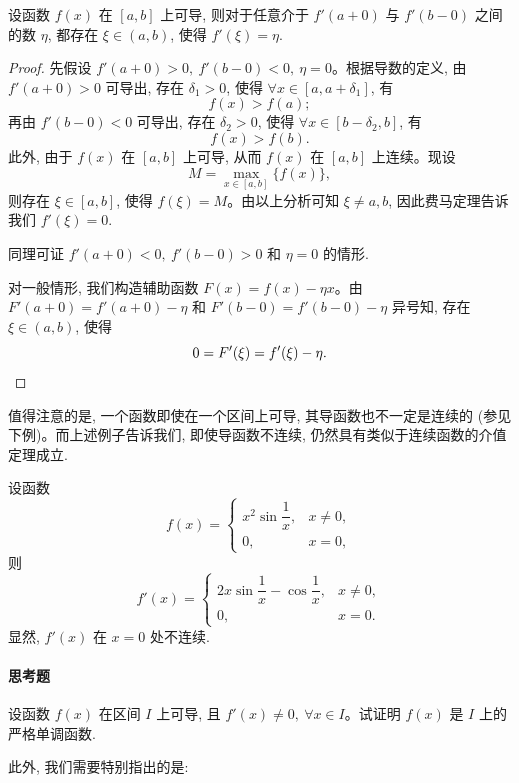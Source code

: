 \begin{example}[{达布 (Darboux) 定理}]\label{example:ma-5-4-4}
设函数 $f(x)$ 在 $[a,b]$ 上可导, 则对于任意介于 $f'(a+0)$ 与 $f'(b-0)$ 之间的数 $\eta$, 都存在 $\xi\in(a,b)$, 使得 $f'(\xi)=\eta$.
\end{example}


\begin{proof}
先假设 $f'(a+0)>0,\ f'(b-0)<0,\ \eta=0$。根据导数的定义, 由 $f'(a+0)>0$ 可导出, 存在 $\delta_1>0$, 使得 $\forall x\in[a,a+\delta_1]$, 有
\[
  f(x)>f(a);
\]
再由 $f'(b-0)<0$ 可导出, 存在 $\delta_2>0$, 使得 $\forall x\in[b-\delta_2,b]$, 有
\[
  f(x)>f(b).
\]
此外, 由于 $f(x)$ 在 $[a,b]$ 上可导, 从而 $f(x)$ 在 $[a,b]$ 上连续。现设
\[
  M=\max_{x\in[a,b]}\{f(x)\},
\]
则存在 $\xi\in[a,b]$, 使得 $f(\xi)=M$。由以上分析可知 $\xi\ne a,b$, 因此费马定理告诉我们 $f'(\xi)=0$.

同理可证 $f'(a+0)<0,\ f'(b-0)>0$ 和 $\eta=0$ 的情形.

对一般情形, 我们构造辅助函数 $F(x)=f(x)-\eta x$。由 $F'(a+0)=f'(a+0)-\eta$ 和 $F'(b-0)=f'(b-0)-\eta$ 异号知, 存在 $\xi\in(a,b)$, 使得
\[
  0=F'(\xi)=f'(\xi)-\eta.
\qedhere
\]
\end{proof}


\begin{remark}\label{remark:ma-5-source-116}
值得注意的是, 一个函数即使在一个区间上可导, 其导函数也不一定是连续的 (参见下例)。而上述例子告诉我们, 即使导函数不连续, 仍然具有类似于连续函数的介值定理成立.
\end{remark}


\begin{example}\label{example:ma-5-4-5}
设函数
\[
  f(x)=
  \begin{cases}
    x^2\sin\dfrac1x, & x\ne0,\\
    0, & x=0,
  \end{cases}
\]
则
\[
  f'(x)=
  \begin{cases}
    2x\sin\dfrac1x-\cos\dfrac1x, & x\ne0,\\
    0, & x=0.
  \end{cases}
\]
显然, $f'(x)$ 在 $x=0$ 处不连续.
\end{example}


\paragraph*{思考题}
设函数 $f(x)$ 在区间 $I$ 上可导, 且 $f'(x)\ne0,\ \forall x\in I$。试证明 $f(x)$ 是 $I$ 上的严格单调函数.

此外, 我们需要特别指出的是:

